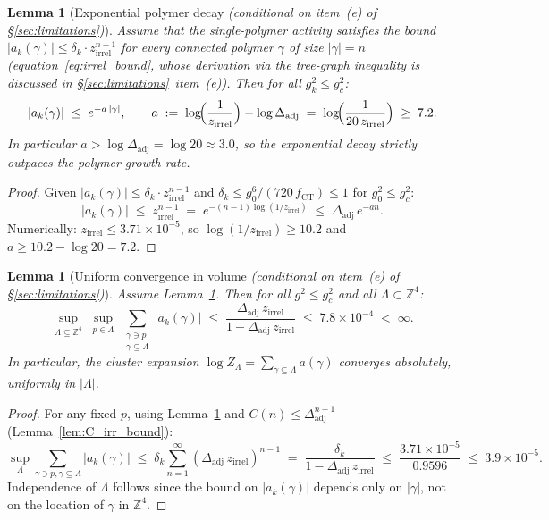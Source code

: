 \documentclass[11pt,a4paper]{amsart}
\newtheorem{lemma}[theorem]{Lemma}
\theoremstyle{definition}
\newcommand{\Z}{\mathbb{Z}}
\newcommand{\gB}{g^2_c}
\newcommand{\CT}{\mathrm{CT}}
\begin{document}
\begin{lemma}[Exponential polymer decay {\normalfont\textit{(conditional on item~(e) of \S\ref{sec:limitations})}}]
\label{lem:exp_decay}
\emph{Assume} that the single-polymer activity satisfies the bound
$|a_k(\gamma)| \le \delta_k \cdot z_{\mathrm{irrel}}^{n-1}$ for every connected polymer
$\gamma$ of size $|\gamma| = n$ \textup{(}equation~\eqref{eq:irrel_bound}, whose derivation
via the tree-graph inequality is discussed in \S\ref{sec:limitations}~item~\textup{(e)}\textup{)}.
Then for all $g^2_k \le \gB$:
\begin{equation}
\label{eq:exp_decay}
  |a_k(\gamma)| \;\le\; e^{-a\,|\gamma|},
  \qquad
  a \;:=\; \log\!\Bigl(\frac{1}{z_{\mathrm{irrel}}}\Bigr) - \log\Delta_{\mathrm{adj}}
  \;=\; \log\!\Bigl(\frac{1}{20\,z_{\mathrm{irrel}}}\Bigr)
  \;\ge\; 7.2.
\end{equation}
In particular $a > \log \Delta_{\mathrm{adj}} = \log 20 \approx 3.0$,
so the exponential decay strictly outpaces the polymer growth rate.
\end{lemma}
\begin{proof}
Given $|a_k(\gamma)| \le \delta_k \cdot z_{\mathrm{irrel}}^{n-1}$ and
$\delta_k \le g^6_0/(720\,f_{\CT}) \le 1$ for $g^2_0 \le \gB$:
\[
  |a_k(\gamma)|
  \;\le\; z_{\mathrm{irrel}}^{n-1}
  \;=\; e^{-(n-1)\log(1/z_{\mathrm{irrel}})}
  \;\le\; \Delta_{\mathrm{adj}}\, e^{-an}.
\]
Numerically: $z_{\mathrm{irrel}} \le 3.71\times10^{-5}$, so
$\log(1/z_{\mathrm{irrel}}) \ge 10.2$ and $a \ge 10.2 - \log 20 = 7.2$.
\end{proof}

\begin{lemma}[Uniform convergence in volume {\normalfont\textit{(conditional on item~(e) of \S\ref{sec:limitations})}}]
\label{lem:uniform_vol}
\emph{Assume} Lemma~\ref{lem:exp_decay}.  Then for all $g^2 \le \gB$ and all $\Lambda \subset \Z^4$:
\begin{equation}
\label{eq:uniform_vol}
  \sup_{\Lambda\subseteq\Z^4}\;\sup_{p\in\Lambda}\;
  \sum_{\substack{\gamma \ni p \\ \gamma \subseteq \Lambda}}
  |a_k(\gamma)|
  \;\le\;
  \frac{\Delta_{\mathrm{adj}}\,z_{\mathrm{irrel}}}{1 - \Delta_{\mathrm{adj}}\,z_{\mathrm{irrel}}}
  \;\le\; 7.8 \times 10^{-4}
  \;<\; \infty.
\end{equation}
In particular, the cluster expansion $\log Z_\Lambda = \sum_{\gamma \subseteq \Lambda} a(\gamma)$
converges absolutely, uniformly in $|\Lambda|$.
\end{lemma}
\begin{proof}
For any fixed $p$, using Lemma~\ref{lem:exp_decay} and $C(n) \le \Delta_{\mathrm{adj}}^{n-1}$
(Lemma~\ref{lem:C_irr_bound}):
\[
  \sup_{\Lambda}\sum_{\gamma\ni p,\gamma\subseteq\Lambda} |a_k(\gamma)|
  \;\le\; \delta_k \sum_{n=1}^\infty (\Delta_{\mathrm{adj}}\,z_{\mathrm{irrel}})^{n-1}
  \;=\; \frac{\delta_k}{1-\Delta_{\mathrm{adj}}\,z_{\mathrm{irrel}}}
  \;\le\; \frac{3.71\times10^{-5}}{0.9596}
  \;\le\; 3.9\times10^{-5}.
\]
Independence of $\Lambda$ follows since the bound on $|a_k(\gamma)|$ depends only on
$|\gamma|$, not on the location of $\gamma$ in $\Z^4$.
\end{proof}
\end{document}
